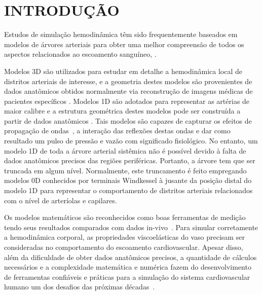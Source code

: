 \chapter{INTRODUÇÃO}\label{sec:intro}  %

Estudos de simulação hemodinâmica têm sido frequentemente baseados em modelos de árvores arteriais para obter uma melhor compreensão de todos os aspectos relacionados ao escoamento sanguíneo,  \cite{Formaggia2001}. 

Modelos 3D são utilizados para estudar em detalhe a hemodinâmica local de distritos arteriais de interesse, e a geometria destes modelos são provenientes de dados anatômicos obtidos normalmente via reconstrução de imagens médicas de pacientes específicos \cite{Peskin1972,Taylor1998}. Modelos 1D são adotados para representar as artérias de maior calibre e a estrutura geométrica destes modelos pode ser construída a partir de dados anatômicos \cite{Avolio,Formaggia2003,Stergiopulos1992}. Tais modelos são capazes de capturar os efeitos de propagação de ondas~\cite{Anliker1971,Duan}, a interação das reflexões destas ondas e dar como resultado um pulso de pressão e vazão com significado fisiológico. No entanto, um modelo 1D de toda a árvore arterial sistêmica não é possível devido à falta de dados anatômicos precisos das regiões periféricas. Portanto, a árvore tem que ser truncada em algum nível. Normalmente, este truncamento é feito empregando modelos 0D \cite{Mates1988,Stergiopulos1992} conhecidos por terminais Windkessel à jusante da posição distal do modelo 1D para representar o comportamento de distritos arteriais relacionados com o nível de arteríolas e capilares. 

Os modelos matemáticos são reconhecidos como boas ferramentas de medição tendo seus resultados comparados com dados in-vivo~\cite{BERTAGLIA2020109595}. Para simular corretamente a hemodinâmica corporal, as propriedades viscoelásticas do vaso precisam ser consideradas no comportamento do escoamento cardiovascular. Apesar disso, além da dificuldade de obter dados anatômicos precisos, a quantidade de cálculos necessários e a complexidade matemática e numérica fazem do desenvolvimento de ferramentas confiáveis e práticas para a simulação do sistema cardiovascular humano um dos desafios das próximas décadas~\cite{QUARTERONI20043}.

